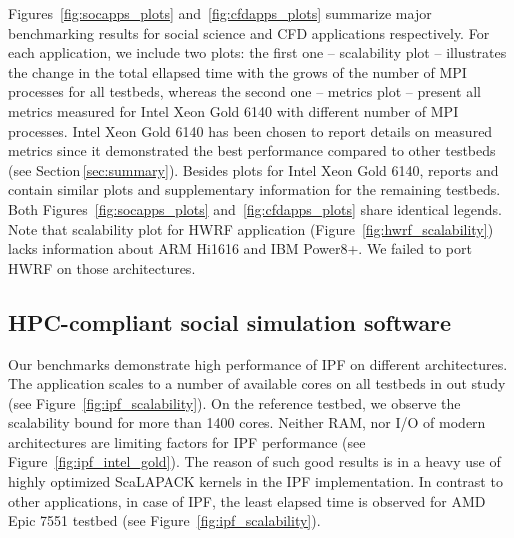 Figures~\ref{fig:socapps_plots} and~\ref{fig:cfdapps_plots} summarize major benchmarking results
for social science and CFD applications respectively.
For each application, we include two plots:
the first one -- scalability plot -- illustrates the change
in the total ellapsed time with the grows of the number of MPI processes for all testbeds,
whereas the second one -- metrics plot -- present all metrics measured for Intel Xeon Gold 6140 with different number of MPI processes.
Intel Xeon Gold 6140 has been  chosen to report details on measured metrics 
since it demonstrated the best performance compared to other testbeds (see Section\,\ref{sec:summary}).
Besides plots for Intel Xeon Gold 6140,
reports \cite{2017:coegss_benchmark1} and \cite{2018:coegss_benchmark2} contain similar plots and supplementary information for the remaining testbeds.
Both Figures~\ref{fig:socapps_plots} and~\ref{fig:cfdapps_plots} share identical legends.
Note that scalability plot for HWRF application (Figure~\ref{fig:hwrf_scalability}) lacks information about ARM Hi1616 and IBM Power8+.
We failed to port HWRF on those architectures.

\subsection{HPC-compliant social simulation software}


Our benchmarks demonstrate high performance of IPF on different  architectures.
The application scales to a number of available cores on all testbeds in out study (see Figure~\ref{fig:ipf_scalability}).
On the reference testbed, we observe the scalability bound for more than 1400 cores.
Neither  RAM, nor I/O of modern architectures are limiting factors for IPF performance (see Figure~\ref{fig:ipf_intel_gold}).
The reason of such good results is in a heavy use of highly optimized \textsf{ScaLAPACK} kernels in the IPF implementation.
In contrast to other applications, in case of IPF, the least elapsed time is observed for AMD Epic 7551 testbed (see Figure~\ref{fig:ipf_scalability}).

